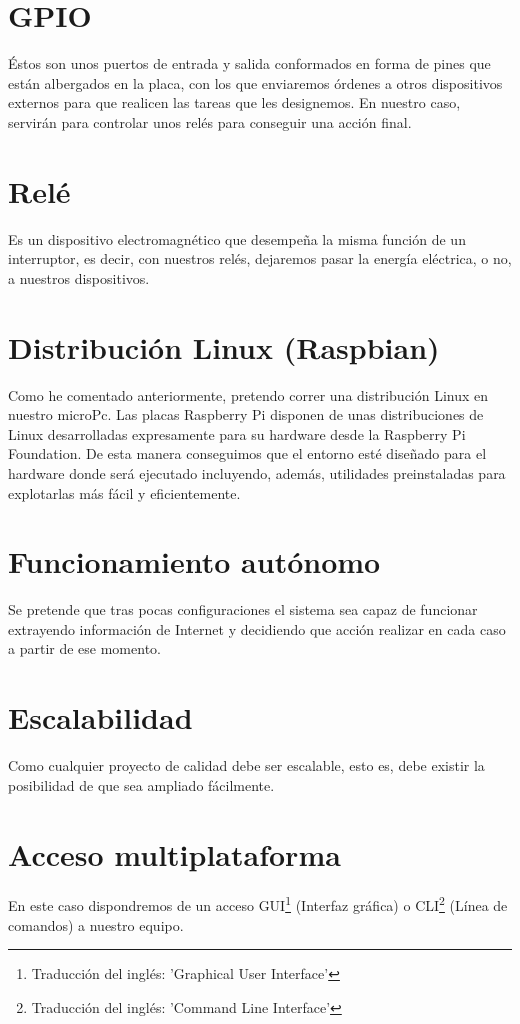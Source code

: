 \section{GPIO}
Éstos son unos puertos de entrada y salida conformados en forma de pines que están albergados en la placa, con los que enviaremos órdenes a otros dispositivos externos para que realicen las tareas que les designemos. En nuestro caso, servirán para controlar unos relés para conseguir una acción final.


\section{Relé}
Es un dispositivo electromagnético que desempeña la misma función de un interruptor, es decir, con nuestros relés, dejaremos pasar la energía eléctrica, o no, a nuestros dispositivos.

\section{Distribución Linux (Raspbian)}
Como he comentado anteriormente, pretendo correr una distribución Linux en nuestro microPc. Las placas Raspberry Pi disponen de unas distribuciones de Linux desarrolladas expresamente para su hardware desde la Raspberry Pi Foundation. De esta manera conseguimos que el entorno esté diseñado para el hardware donde será ejecutado incluyendo, además, utilidades preinstaladas para explotarlas más fácil y eficientemente.

\section{Funcionamiento autónomo}
Se pretende que tras pocas configuraciones el sistema sea capaz de funcionar extrayendo información de Internet y decidiendo que acción realizar en cada caso a partir de ese momento.

\section{Escalabilidad}
Como cualquier proyecto de calidad debe ser escalable, esto es, debe existir la posibilidad de que sea ampliado fácilmente.

\section{Acceso multiplataforma}
En este caso dispondremos de un acceso GUI\footnote{Traducción del inglés: 'Graphical User Interface'} (Interfaz gráfica) o CLI\footnote{Traducción del inglés: 'Command Line Interface'} (Línea de comandos) a nuestro equipo.

